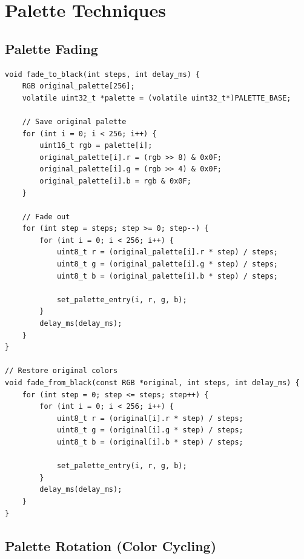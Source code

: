 \documentclass[11pt,letterpaper]{report}
\begin{document}
\section{Palette Techniques}

\subsection{Palette Fading}

\begin{lstlisting}[style=c,caption={Fade to Black Effect}]
void fade_to_black(int steps, int delay_ms) {
    RGB original_palette[256];
    volatile uint32_t *palette = (volatile uint32_t*)PALETTE_BASE;
    
    // Save original palette
    for (int i = 0; i < 256; i++) {
        uint16_t rgb = palette[i];
        original_palette[i].r = (rgb >> 8) & 0x0F;
        original_palette[i].g = (rgb >> 4) & 0x0F;
        original_palette[i].b = rgb & 0x0F;
    }
    
    // Fade out
    for (int step = steps; step >= 0; step--) {
        for (int i = 0; i < 256; i++) {
            uint8_t r = (original_palette[i].r * step) / steps;
            uint8_t g = (original_palette[i].g * step) / steps;
            uint8_t b = (original_palette[i].b * step) / steps;
            
            set_palette_entry(i, r, g, b);
        }
        delay_ms(delay_ms);
    }
}

// Restore original colors
void fade_from_black(const RGB *original, int steps, int delay_ms) {
    for (int step = 0; step <= steps; step++) {
        for (int i = 0; i < 256; i++) {
            uint8_t r = (original[i].r * step) / steps;
            uint8_t g = (original[i].g * step) / steps;
            uint8_t b = (original[i].b * step) / steps;
            
            set_palette_entry(i, r, g, b);
        }
        delay_ms(delay_ms);
    }
}
\end{lstlisting}

\subsection{Palette Rotation (Color Cycling)}
\end{document}
